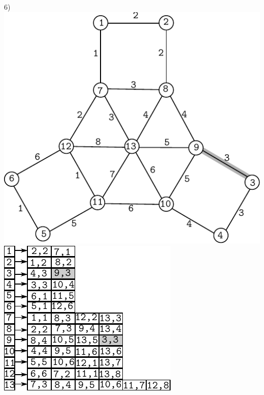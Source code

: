 \documentclass{article}
\begin{document}
\begin{center}
6)\includegraphics[scale=0.6]{bottleneck/g6}
\hspace{5mm}
\includegraphics[scale=0.9]{bottleneck/l6}
\end{center}
\end{document}
